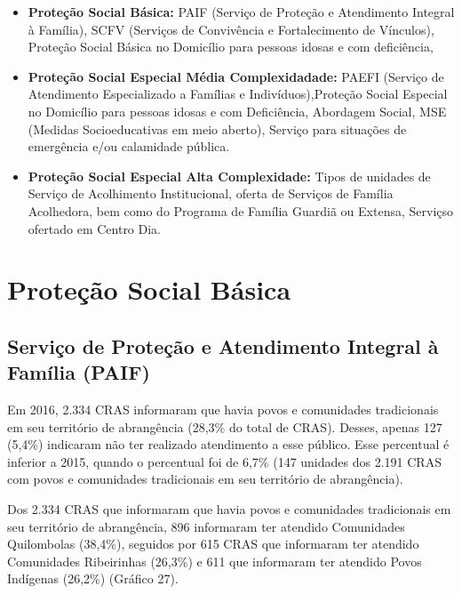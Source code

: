 \documentclass[
  brazilian]{report}
\begin{document}
\begin{itemize}
\item
  \textbf{Proteção Social Básica:} PAIF (Serviço de Proteção e
  Atendimento Integral à Família), SCFV (Serviços de Convivência e
  Fortalecimento de Vínculos), Proteção Social Básica no Domicílio para
  pessoas idosas e com deficiência,
\item
  \textbf{Proteção Social Especial Média Complexidadade:} PAEFI (Serviço
  de Atendimento Especializado a Famílias e Indivíduos),Proteção Social
  Especial no Domicílio para pessoas idosas e com Deficiência, Abordagem
  Social, MSE (Medidas Socioeducativas em meio aberto), Serviço para
  situações de emergência e/ou calamidade pública.
\item
  \textbf{Proteção Social Especial Alta Complexidade:} Tipos de unidades
  de Serviço de Acolhimento Institucional, oferta de Serviços de Família
  Acolhedora, bem como do Programa de Família Guardiã ou Extensa,
  Serviçso ofertado em Centro Dia.
\end{itemize}

\hypertarget{proteuxe7uxe3o-social-buxe1sica}{%
\section{Proteção Social Básica}\label{proteuxe7uxe3o-social-buxe1sica}}

\hypertarget{serviuxe7o-de-proteuxe7uxe3o-e-atendimento-integral-uxe0-famuxedlia-paif}{%
\subsection{Serviço de Proteção e Atendimento Integral à Família
(PAIF)}\label{serviuxe7o-de-proteuxe7uxe3o-e-atendimento-integral-uxe0-famuxedlia-paif}}

Em 2016, 2.334 CRAS informaram que havia povos e comunidades
tradicionais em seu território de abrangência (28,3\% do total de CRAS).
Desses, apenas 127 (5,4\%) indicaram não ter realizado atendimento a
esse público. Esse percentual é inferior a 2015, quando o percentual foi
de 6,7\% (147 unidades dos 2.191 CRAS com povos e comunidades
tradicionais em seu território de abrangência).

Dos 2.334 CRAS que informaram que havia povos e comunidades tradicionais
em seu território de abrangência, 896 informaram ter atendido
Comunidades Quilombolas (38,4\%), seguidos por 615 CRAS que informaram
ter atendido Comunidades Ribeirinhas (26,3\%) e 611 que informaram ter
atendido Povos Indígenas (26,2\%) (Gráfico 27).
\end{document}
